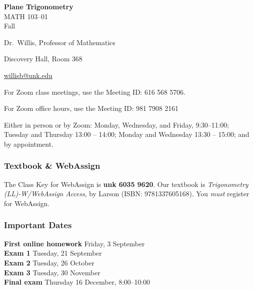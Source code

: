 \documentclass[12pt]{article}
\newcounter{ex}\setcounter{ex}{0}
\newenvironment{mypar}[2]
  {\begin{list}{}%
    {\setlength\leftmargin{#1}
    \setlength\rightmargin{#2}}
    \item[]}
  {\end{list}}
\newcommand{\term}{Fall }
\renewenvironment{description}[0]{\begin{compactdesc}}{\end{compactdesc}}
\newcommand{\coursename}{Plane Trigonometry}
\newcommand{\coursenumber}{MATH 103}
\newcommand{\sectionnumber}{01}
\begin{document}
\large
\begin{center}
    \textbf{\coursename}  \\
    {\coursenumber--\sectionnumber} \\
     {\term \the\year} \\
\end{center}

\vskip0.25in
\normalsize


\begin{center}
\begin{description}
    \item[Instructor:] Dr.\  Willis, Professor of Mathematics
    \item[Office:]  Discovery Hall, Room 368
    \item[\phone:]   
    \item[\Email:]    \href{mailto:willisb@unk.edu}{willisb@unk.edu}
    \item[Zoom for classes:] For Zoom class meetings, use the Meeting ID: 616 568 5706. 
    \item[Zoom for office hours:] For Zoom office hours, use the Meeting ID: 981 7908 2161 
    \item[Office Hours:] Either in person or by Zoom: Monday, Wednesday, and  Friday, \mbox{9:30--11:00}; Tuesday and Thursday 13:00 -- 14:00; Monday and Wednesday 13:30 -- 15:00;  and by appointment.
  \end{description}
\end{center}

\subsubsection*{Textbook \& WebAssign}



The Class Key for WebAssign is \textbf{unk 6035 9620}. Our textbook is
\emph{Trigonometry (LL)-W/WebAssign Access}, by Larson (ISBN: 9781337605168).
You \emph{must} register for WebAssign.

\subsubsection*{Important Dates}

\begin{mypar}{0.25in}{0.25in}
    \textbf{First online homework} \dotfill Friday, 3 September \\
    \textbf{Exam 1} \dotfill Tuesday, 21 September \\
    \textbf{Exam 2} \dotfill Tuesday, 26 October \\
    \textbf{Exam 3} \dotfill Tuesday, 30 November \\
     \textbf{Final exam} \dotfill Thursday 16 December, 8:00--10:00
\end{mypar}
\end{document}
